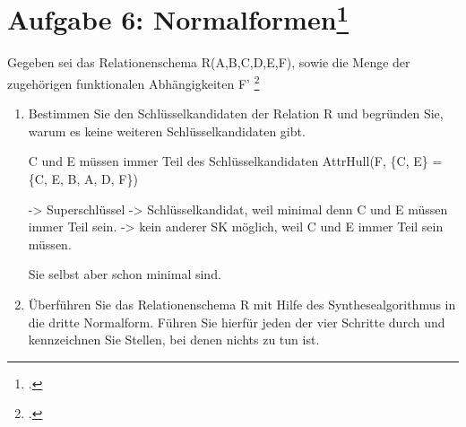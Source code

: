 \documentclass{lehramt-informatik-aufgabe}
\begin{document}
\let\FA=\liFunktionaleAbhaengigkeiten


\section{Aufgabe 6: Normalformen\footcite{examen:66116:2018:03}}

Gegeben sei das Relationenschema R(A,B,C,D,E,F), sowie die Menge der
zugehörigen funktionalen Abhängigkeiten F' \footcite{db:pu:wh}

\FA{
  C -> B;
  B -> A;
  C, E -> D;
  E -> F;
  C, E -> F;
  C -> A;
}

\begin{enumerate}
\item Bestimmen Sie den Schlüsselkandidaten der Relation R und begründen
Sie, warum es keine weiteren Schlüsselkandidaten gibt.

\begin{liAntwort}
 C und E müssen immer Teil des Schlüsselkandidaten
AttrHull(F, \{C, E\} = \{C, E, B, A, D, F\})

-> Superschlüssel
-> Schlüsselkandidat, weil minimal denn C und E müssen immer Teil sein.
-> kein anderer SK möglich, weil C und E immer Teil sein müssen.

Sie selbst aber schon minimal sind.
\end{liAntwort}

\item Überführen Sie das Relationenschema R mit Hilfe des
Synthesealgorithmus in die dritte
Normalform. Führen Sie hierfür jeden der vier
Schritte durch und kennzeichnen Sie Stellen, bei denen nichts zu tun
ist.
\end{enumerate}
\end{document}

